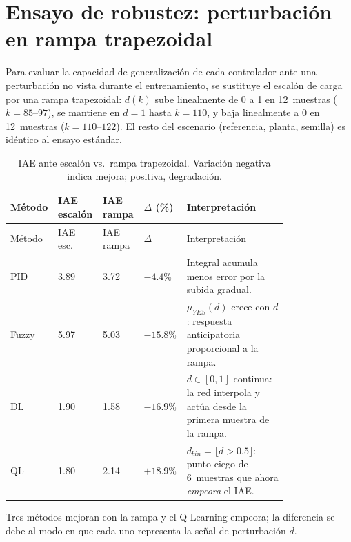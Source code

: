 \section{Ensayo de robustez: perturbación en rampa trapezoidal}
\label{sec:robustez_rampa}

Para evaluar la capacidad de generalización de cada controlador ante una perturbación no vista durante el entrenamiento, se sustituye el escalón de carga por una rampa trapezoidal: $d(k)$ sube linealmente de 0 a 1 en 12~muestras ($k=85$--$97$), se mantiene en $d=1$ hasta $k=110$, y baja linealmente a 0 en 12~muestras ($k=110$--$122$). El resto del escenario (referencia, planta, semilla) es idéntico al ensayo estándar.


\begin{longtable}{@{}P{0.10\linewidth}P{0.12\linewidth}P{0.12\linewidth}P{0.10\linewidth}P{0.36\linewidth}@{}}
\caption{IAE ante escalón vs.\ rampa trapezoidal. Variación negativa indica mejora; positiva, degradación.}
\label{tab:robustez_rampa}\\
\toprule
Método & IAE escalón & IAE rampa & $\Delta$ (\%) & Interpretación \\ \midrule \endfirsthead
\toprule Método & IAE esc. & IAE rampa & $\Delta$ & Interpretación \\ \midrule \endhead
PID   & 3.89 & 3.72 & $-4.4\%$  & Integral acumula menos error por la subida gradual. \\
Fuzzy & 5.97 & 5.03 & $-15.8\%$ & $\mu_{YES}(d)$ crece con $d$: respuesta anticipatoria proporcional a la rampa.\\
DL    & 1.90 & 1.58 & $-16.9\%$ & $d\in[0,1]$ continua: la red interpola y actúa desde la primera muestra de la rampa.\\
QL    & 1.80 & 2.14 & $+18.9\%$ & $d_{bin}=\lfloor d{>}0.5\rfloor$: punto ciego de 6~muestras que ahora \emph{empeora} el IAE.\\
\bottomrule
\end{longtable}

Tres métodos mejoran con la rampa y el Q-Learning empeora; la diferencia se debe al modo en que cada uno representa la señal de perturbación $d$.

